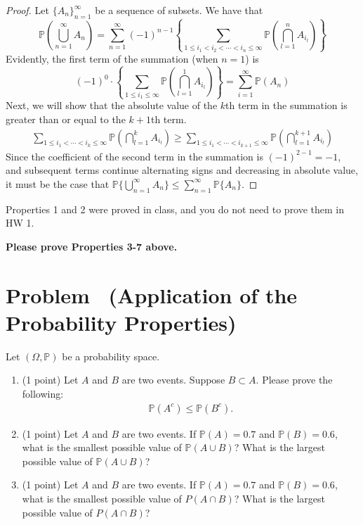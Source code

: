 \documentclass[11pt]{article}
\newcounter{pppp}
\newcommand{\prob}{\arabic{pppp}} %
\newcommand{\increase}{\addtocounter{pppp}{1}} %
\newcommand{\newproblem}[2]{
    \increase
    \section*{Problem \prob~(#1) \hfill {#2}}
}
\newcommand{\p}{\mathbb{P}}
\begin{document}
\begin{enumerate}
\begin{proof}
  Let \(\{A_n\}^{\infty}_{n=1}\) be a sequence of subsets. We have that 
  \[      
    \mathbb{P}\left(\bigcup_{n=1}^\infty A_n\right)=\sum_{n=1}^\infty(-1)^{n-1}\left\{\sum_{1\le i_1<i_2<\cdots<i_n\le \infty} \mathbb{P}\left(\bigcap_{l=1}^n A_{i_l}\right)\right\}
  \]
  Evidently, the first term of the summation (when \(n=1\)) is
  \[
   (-1)^0\cdot \left\{\sum_{1\le i_1 \le \infty} \mathbb{P}\left(\bigcap_{l=1}^1 A_{i_l}\right)\right\} = \sum_{i=1}^\infty \p(A_n)
  \]
  Next, we will show that the absolute value of the \(k\)th term in the summation is greater than or equal to the \(k+1\)th term.
  \begin{align*}
    \sum_{1\leq i_1<\cdots<i_k\leq\infty} \p\left(\bigcap_{l=1}^k A_{i_l}\right) \geq
    \sum_{1\leq i_1<\cdots<i_{k+1}\leq\infty} \p\left(\bigcap_{l=1}^{k+1} A_{i_l}\right)
  \end{align*}
  Since the coefficient of the second term in the summation is \((-1)^{2-1}=-1\), and subsequent terms continue alternating signs and
  decreasing in absolute value, it must be the case that \(\mathbb{P}\{\bigcup_{n=1}^\infty A_n\}\le\sum_{n=1}^\infty\mathbb{P}\{A_n\}\).
\end{proof}
    
\end{enumerate}

Properties 1 and 2 were proved in class, and you do not need to prove them in HW 1. 

\textbf{Please prove Properties 3-7 above.}

\newproblem{Application of the Probability Properties}{ }

Let $(\Omega, \mathbb{P})$ be a probability space.

\begin{enumerate}
\item (1 point) Let $A$ and $B$ are two events. Suppose $B\subset A$. Please prove the following:
\begin{align*}
\mathbb{P}(A^c) \le \mathbb{P}(B^c).
\end{align*}

\item (1 point) Let $A$ and $B$ are two events. If $\mathbb{P}(A) = 0.7$ and $\mathbb{P}(B)=0.6$,  what is the smallest possible value of $\mathbb{P}(A\cup B)$? What is the largest possible value of $\mathbb{P}(A\cup B)$? 

\item (1 point) Let $A$ and $B$ are two events. If $\mathbb{P}(A) = 0.7$ and $\mathbb{P}(B)=0.6$, what is the smallest possible value of $P(A\cap B)$? What is the largest possible value of $P(A\cap B)$? 


\end{enumerate}
\end{document}
